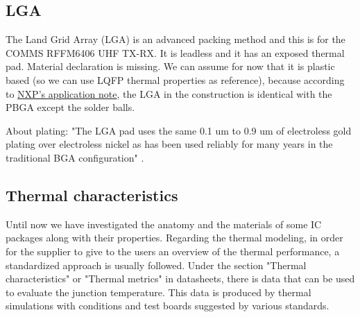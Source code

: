 \documentclass[final]{cubedoc}
\begin{document}
	\subsection{LGA}
	
	The Land Grid Array (LGA) is an advanced packing method and this is for the COMMS RFFM6406 UHF TX-RX. It is leadless and it has an exposed thermal pad. Material declaration is missing. We can assume for now that it is plastic based (so we can use LQFP thermal properties as reference), because according to \href{https://web.archive.org/web/20200818134018/https://www.nxp.com/docs/en/application-note/AN2265.pdf}{NXP's application note}, the LGA in the construction is identical with the PBGA except the solder balls. 
	
	About plating: "The LGA pad uses the same 0.1 um to 0.9 um of electroless gold plating over electroless nickel as has been used reliably for many years in the traditional BGA configuration" \cite{nxpplating}.
	
	
	\subsection{Thermal characteristics}
	
	
	Until now we have investigated the anatomy and the materials of some IC packages along with their properties. Regarding the thermal modeling, in order for the supplier to give to the users an overview of the thermal performance, a standardized approach is usually followed. Under the section "Thermal characteristics" or "Thermal metrics" in datasheets,  there is data that can be used to evaluate the junction temperature. This data is produced by thermal simulations with conditions and test boards suggested by various standards.
	
\end{document}

